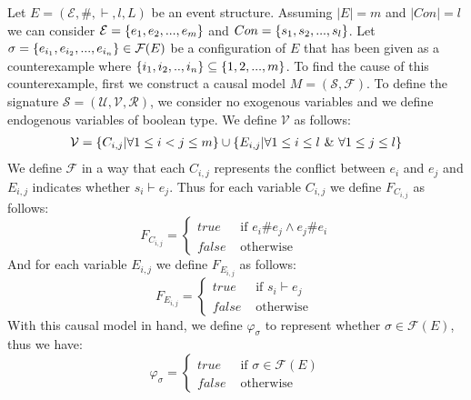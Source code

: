 \documentclass{article}
\begin{document}
Let $E = (\mathcal{E},\#,\vdash,l,L)$ be an event structure.
Assuming $|E| = m$ and $|Con| = l$ we can consider
$\mathcal{E} = \{e_1, e_2, ...,e_m\}$ and $Con = \{s_1,s_2,...,s_l\}$.
Let $\sigma = \{e_{i_1},e_{i_2},...,e_{i_n}\} \in \mathcal{F}(E)$ be a configuration of $E$ that
has been given as a counterexample where $\{i_1,i_2,..,i_n\} \subseteq \{1,2,...,m\}$.
To find the cause of this counterexample, first we construct a causal model $M = (\mathcal{S},\mathcal{F})$.
To define the signature $\mathcal{S} = (\mathcal{U},\mathcal{V},\mathcal{R})$, we consider no exogenous variables and we 
define endogenous variables of boolean type. 
We define $\mathcal{V}$ as follows:
\begin{align*}
    \mathcal{V} = \{C_{i,j} | \forall 1 \leq i < j \leq m\} 
    \cup \{E_{i,j} | \forall 1 \leq i \leq l \ \& \  \forall 1 \leq j \leq l\}
\end{align*}
We define $\mathcal{F}$ in a way that each $C_{i,j}$ represents the conflict
between $e_i$ and $e_j$ and $E_{i,j}$ indicates whether $s_i \vdash e_j$.
Thus for each variable $C_{i,j}$ we define $F_{C_{i,j}}$ as follows:
$$
    F_{C_{i,j}}  = \begin{cases}
        true & \text{ if } e_i \# e_j \wedge e_j \# e_i \\
        false & \text{ otherwise }
    \end{cases}
$$
And for each variable $E_{i,j}$ we define $F_{E_{i,j}}$ as follows:
$$
    F_{E_{i,j}} = \begin{cases}
        true & \text{ if } s_i \vdash e_j \\
        false & \text{ otherwise }
    \end{cases}
$$
With this causal model in hand, we define $\varphi_{\sigma}$ to represent whether $\sigma \in \mathcal{F}(E)$, thus we have:
$$
    \varphi_{\sigma} = \begin{cases}
        true & \text{ if } \sigma \in \mathcal{F}(E) \\
        false & \text{ otherwise}
    \end{cases}
$$
\end{document}
